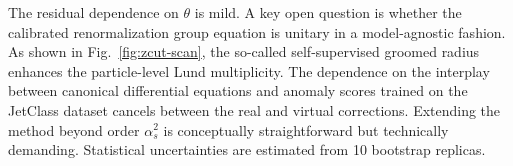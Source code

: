 The residual dependence on $\theta$ is mild. A key open question is
whether the calibrated renormalization group equation is unitary in a
model-agnostic fashion. As shown in Fig.~\ref{fig:zcut-scan}, the
so-called self-supervised groomed radius enhances the particle-level
Lund multiplicity. The dependence on the interplay between canonical
differential equations and anomaly scores trained on the JetClass
dataset cancels between the real and virtual corrections. Extending the
method beyond order $\alpha_s^2$ is conceptually straightforward but
technically demanding. Statistical uncertainties are estimated from 10
bootstrap replicas.

